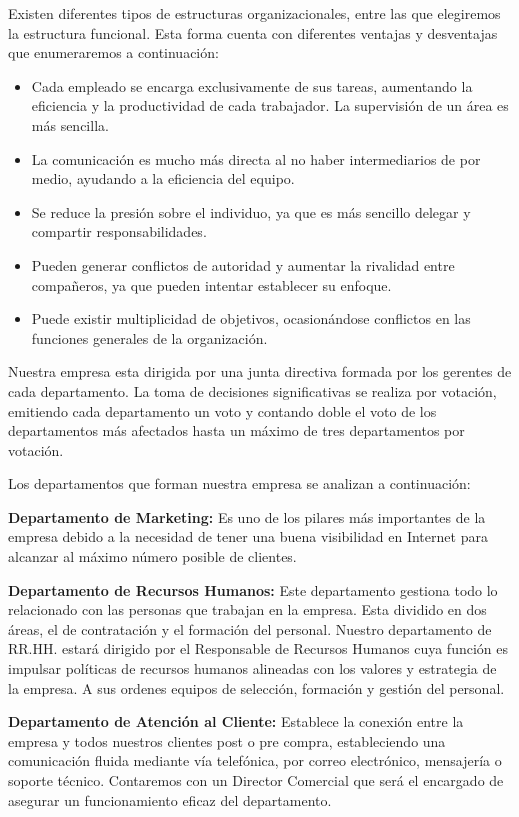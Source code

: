 Existen diferentes tipos de estructuras organizacionales, entre las que elegiremos la estructura funcional. Esta forma cuenta con diferentes ventajas y desventajas que enumeraremos a continuación:

\begin{itemize}
    \item Cada empleado se encarga exclusivamente de sus tareas, aumentando la eficiencia y la productividad de cada trabajador.
    La supervisión de un área es más sencilla.
    \item La comunicación es mucho más directa al no haber intermediarios de por medio, ayudando a la eficiencia del equipo.
    \item Se reduce la presión sobre el individuo, ya que es más sencillo delegar y compartir responsabilidades.
    \item Pueden generar conflictos de autoridad y aumentar la rivalidad entre compañeros, ya que pueden intentar establecer su enfoque.
    \item Puede existir multiplicidad de objetivos, ocasionándose conflictos en las funciones generales de la organización.    
\end{itemize}

Nuestra empresa esta dirigida por una junta directiva formada por los gerentes de cada departamento. La toma de decisiones significativas se realiza por votación, emitiendo cada departamento un voto y contando doble el voto de los departamentos más afectados hasta un máximo de tres departamentos por votación.

Los departamentos que forman nuestra empresa se analizan a continuación:

\textbf{Departamento de Marketing:} Es uno de los pilares más importantes de la empresa debido a la necesidad de tener una buena visibilidad en Internet para alcanzar al máximo número posible de clientes.

\textbf{Departamento de Recursos Humanos:} Este departamento gestiona todo lo relacionado con las personas que trabajan en la empresa. Esta dividido en dos áreas, el de contratación y el formación del personal. Nuestro departamento de RR.HH. estará dirigido por el Responsable de Recursos Humanos cuya función es impulsar políticas de recursos humanos alineadas con los valores y estrategia de la empresa. A sus ordenes equipos de selección, formación y gestión del personal.

\textbf{Departamento de Atención al Cliente:} Establece la conexión entre la empresa y todos nuestros clientes post o pre compra, estableciendo una comunicación fluida mediante vía telefónica, por correo electrónico, mensajería o soporte técnico. Contaremos con un Director Comercial que será el encargado de asegurar un funcionamiento eficaz del departamento.


